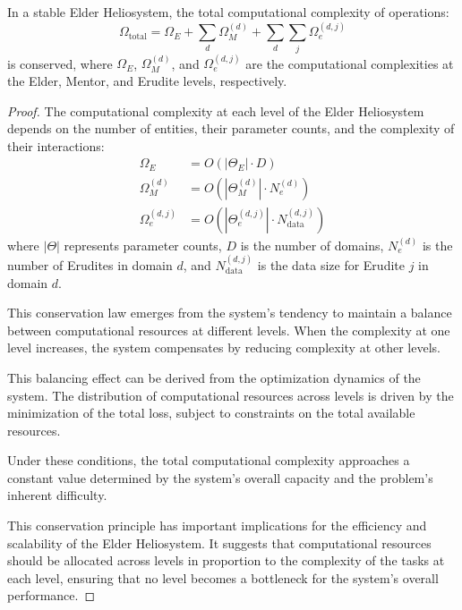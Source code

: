 \begin{theorem}
In a stable Elder Heliosystem, the total computational complexity of operations:
\begin{equation}
\Omega_{\text{total}} = \Omega_E + \sum_d \Omega_M^{(d)} + \sum_d \sum_j \Omega_e^{(d,j)}
\end{equation}
is conserved, where $\Omega_E$, $\Omega_M^{(d)}$, and $\Omega_e^{(d,j)}$ are the computational complexities at the Elder, Mentor, and Erudite levels, respectively.
\end{theorem}

\begin{proof}
The computational complexity at each level of the Elder Heliosystem depends on the number of entities, their parameter counts, and the complexity of their interactions:
\begin{align}
\Omega_E &= O(|\Theta_E| \cdot D) \\
\Omega_M^{(d)} &= O(|\Theta_M^{(d)}| \cdot N_e^{(d)}) \\
\Omega_e^{(d,j)} &= O(|\Theta_e^{(d,j)}| \cdot N_{\text{data}}^{(d,j)})
\end{align}
where $|\Theta|$ represents parameter counts, $D$ is the number of domains, $N_e^{(d)}$ is the number of Erudites in domain $d$, and $N_{\text{data}}^{(d,j)}$ is the data size for Erudite $j$ in domain $d$.

This conservation law emerges from the system's tendency to maintain a balance between computational resources at different levels. When the complexity at one level increases, the system compensates by reducing complexity at other levels.

This balancing effect can be derived from the optimization dynamics of the system. The distribution of computational resources across levels is driven by the minimization of the total loss, subject to constraints on the total available resources.

Under these conditions, the total computational complexity approaches a constant value determined by the system's overall capacity and the problem's inherent difficulty.

This conservation principle has important implications for the efficiency and scalability of the Elder Heliosystem. It suggests that computational resources should be allocated across levels in proportion to the complexity of the tasks at each level, ensuring that no level becomes a bottleneck for the system's overall performance.
\end{proof}


